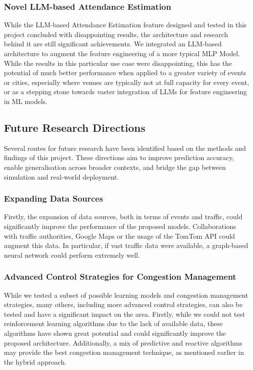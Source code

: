 \subsubsection{Novel LLM-based Attendance Estimation}
While the LLM-based Attendance Estimation feature designed and tested in this project concluded with disappointing results, the architecture and research behind it are still significant achievements.  We integrated an LLM-based architecture to augment the feature engineering of a more typical MLP Model.  While the results in this particular use case were disappointing, this has the potential of much better performance when applied to a greater variety of events or cities, especially where venues are typically not at full capacity for every event, or as a stepping stone towards vaster integration of LLMs for feature engineering in ML models.

\subsection{Future Research Directions}
Several routes for future research have been identified based on the methods and findings of this project.  These directions aim to improve prediction accuracy, enable generalisation across broader contexts, and bridge the gap between simulation and real-world deployment.

\subsubsection{Expanding Data Sources}
 Firstly, the expansion of data sources, both in terms of events and traffic, could significantly improve the performance of the proposed models.  Collaborations with traffic authorities, Google Maps or the usage of the TomTom API could augment this data.  In particular, if vast traffic data were available, a graph-based neural network could perform extremely well.

\subsubsection{Advanced Control Strategies for Congestion Management}
While we tested a subset of possible learning models and congestion management strategies, many others, including more advanced control strategies, can also be tested and have a significant impact on the area.  Firstly, while we could not test reinforcement learning algorithms due to the lack of available data, these algorithms have shown great potential and could significantly improve the proposed architecture. Additionally, a mix of predictive and reactive algorithms may provide the best congestion management technique, as mentioned earlier in the hybrid approach.


